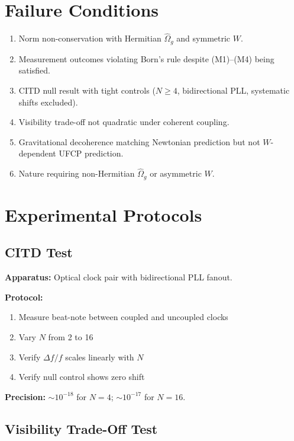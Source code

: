 \documentclass[11pt, a4paper]{article}
\begin{document}
\section{Failure Conditions}

\begin{enumerate}[label=F\arabic*.]
  \item Norm non-conservation with Hermitian $\hat{\Omega}_g$ and
        symmetric $W$.
  \item Measurement outcomes violating Born's rule despite
        (M1)--(M4) being satisfied.
  \item CITD null result with tight controls ($N \geq 4$, bidirectional
        PLL, systematic shifts excluded).
  \item Visibility trade-off not quadratic under coherent coupling.
  \item Gravitational decoherence matching Newtonian prediction but not
        $W$-dependent UFCP prediction.
  \item Nature requiring non-Hermitian $\hat{\Omega}_g$ or asymmetric $W$.
\end{enumerate}

\section{Experimental Protocols}

\subsection{CITD Test}

\textbf{Apparatus:} Optical clock pair with bidirectional PLL fanout.

\textbf{Protocol:}
\begin{enumerate}[nosep]
  \item Measure beat-note between coupled and uncoupled clocks
  \item Vary $N$ from 2 to 16
  \item Verify $\Delta f/f$ scales linearly with $N$
  \item Verify null control shows zero shift
\end{enumerate}

\textbf{Precision:} $\sim 10^{-18}$ for $N = 4$; $\sim 10^{-17}$ for $N = 16$.

\subsection{Visibility Trade-Off Test}
\end{document}
